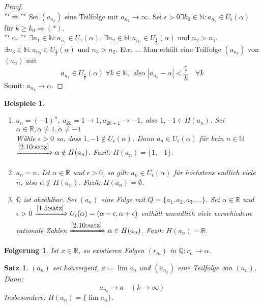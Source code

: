 \documentclass{extreport}
\newcommand{\N}{\mathbb{N}}
\newcommand{\Q}{\mathbb{Q}}
\newcommand{\R}{\mathbb{R}}
\theoremstyle{named}
\theoremstyle{dotless}
\newtheorem{satz}[namedtheorem]{Satz}
\newtheorem*{beispiele}{Beispiele}
\newtheorem*{folgerung*}{Folgerung}
\begin{document}
\begin{proof} ~\\
	$"'\Rightarrow"'$ Sei $(a_{n_{k}})$ eine Teilfolge mit $a_{n_{k}} \rightarrow \infty$. Sei $\epsilon > 0 \exists k_{0} \in \N: a_{n_{k}} \in U_{\epsilon}(\alpha)$ für $k \geq k_{0} \Rightarrow (*)$. \\
	$"'\Leftarrow"'$ $\exists n_{1} \in \N: a_{n_{1}} \in U_{1}(\alpha)$. $\exists n_{2} \in \N: a_{n_{2}} \in U_{\frac{1}{2}}(\alpha)$ und $n_{2} > n_{1}$. $\exists n_{3} \in \N: a_{n_{3}} \in U_{\frac{1}{3}}(\alpha)$ und $n_{3} > n_{2}$. Etc. ... Man erhält eine Teilfolge $(a_{n_{k}})$ von $(a_{n})$ mit
	$$
		a_{n_{k}} \in U_{\frac{1}{k}}(\alpha) ~\forall k \in \N, \text{ also } |a_{n_{k}} - \alpha| < \frac{1}{k} \quad \forall k
	$$
	Somit: $a_{n_{k}} \rightarrow \alpha$. 
\end{proof}


\begin{beispiele}\
	\begin{enumerate}
		\item $a_{n} = (-1)^{n}$, $a_{2k} = 1 \rightarrow 1, a_{2k+1} \rightarrow -1$, also $1, -1 \in H(a_{n})$. Sei $\alpha \in \R, \alpha \neq 1, \alpha \neq -1$ \\
			Wähle $\epsilon>0$ so, dass $1, -1 \notin U_{\epsilon}(\alpha)$. Dann $a_{n} \in U_{\epsilon}(\alpha)$ für kein $n \in \N$ $\xRightarrow[]{\ref{2.10:satz}} \alpha \notin H(a_{n})$. Fazit: $H(a_{n}) = \{ 1, -1 \}$.
		\item $a_{n} = n$. Ist $\alpha \in \R$ und $\epsilon > 0$, so gilt: $a_{n} \in U_{\epsilon}(\alpha)$ für höchstens endlich viele $n$, also $\alpha \notin H(a_{n})$. Fazit: $H(a_{n}) = \emptyset$.
		\item $\Q$ ist abzählbar. Sei $(a_{n})$ eine Folge mit $Q = \{ a_{1}, a_{2}, a_{3}, \dotsc \}$. Sei $\alpha \in \R$ und $\epsilon > 0$ $\xRightarrow[]{\ref{1.5:satz}} U_{\epsilon}(\alpha) = (\alpha - \epsilon, \alpha + \epsilon)$ enthält unendlich viele verschiedene rationale Zahlen $\xRightarrow[]{\ref{2.10:satz}} \alpha \in H(a_{n})$. Fazit: $H(a_{n}) = \R$.
	\end{enumerate}	
\end{beispiele}

\begin{folgerung*}
Ist $x \in \R$, so existieren Folgen $(r_{m})$ in $\Q : r_{n} \rightarrow \alpha$.	
\end{folgerung*}


\begin{satz} \label{2.11:satz} 
	$(a_{n})$ sei konvergent, $a \coloneqq \lim a_{n}$ und $(a_{n_{k}})$ eine Teilfolge von $(a_{n})$. Dann:
	$$ a_{n_{k}} \rightarrow a \quad (k \rightarrow \infty) $$
	Insbesondere: $H(a_{n}) = \{ \lim a_{n} \}$.
\end{satz}
\end{document}

